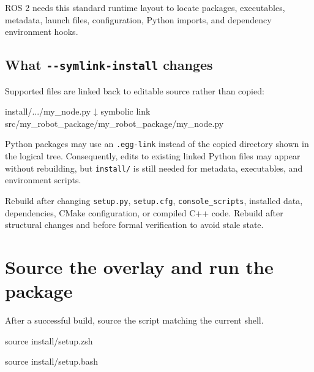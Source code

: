 \documentclass[
  australian,
  12pt,
  letterpaper,
  DIV=11,
  numbers=noendperiod,
  twoside]{scrreprt}
\newenvironment{Shaded}{\begin{snugshade}}{\end{snugshade}}
\newcommand{\BuiltInTok}[1]{\textcolor[rgb]{0.00,0.23,0.31}{#1}}
\newcommand{\NormalTok}[1]{\textcolor[rgb]{0.00,0.23,0.31}{#1}}
\begin{document}
ROS 2 needs this standard runtime layout to locate packages,
executables, metadata, launch files, configuration, Python imports, and
dependency environment hooks.

\subsection{\texorpdfstring{What \texttt{-\/-symlink-install}
changes}{What -\/-symlink-install changes}}\label{what---symlink-install-changes}

Supported files are linked back to editable source rather than copied:

\begin{Shaded}
\begin{Highlighting}[]
\NormalTok{install/.../my\_node.py}
\NormalTok{        ↓ symbolic link}
\NormalTok{src/my\_robot\_package/my\_robot\_package/my\_node.py}
\end{Highlighting}
\end{Shaded}

Python packages may use an \texttt{.egg-link} instead of the copied
directory shown in the logical tree. Consequently, edits to existing
linked Python files may appear without rebuilding, but \texttt{install/}
is still needed for metadata, executables, and environment scripts.

Rebuild after changing \texttt{setup.py}, \texttt{setup.cfg},
\texttt{console\_scripts}, installed data, dependencies, CMake
configuration, or compiled C++ code. Rebuild after structural changes
and before formal verification to avoid stale state.

\section{Source the overlay and run the
package}\label{source-the-overlay-and-run-the-package}

After a successful build, source the script matching the current shell.

\begin{Shaded}
\begin{Highlighting}[]
\BuiltInTok{source}\NormalTok{ install/setup.zsh}
\end{Highlighting}
\end{Shaded}

\begin{Shaded}
\begin{Highlighting}[]
\BuiltInTok{source}\NormalTok{ install/setup.bash}
\end{Highlighting}
\end{Shaded}
\end{document}
